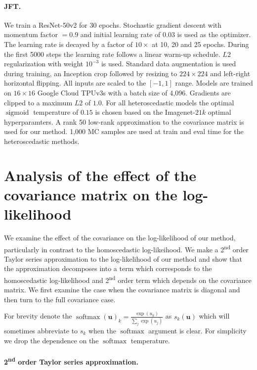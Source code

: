 \documentclass[final]{cvpr}
\DeclareMathOperator*{\softmax}{softmax}
\DeclareMathOperator*{\sigmoid}{sigmoid}
\begin{document}
\paragraph{JFT.} We train a ResNet-50v2 \cite{he2016deep} for 30 epochs. Stochastic gradient descent with momentum factor $= 0.9$ and initial learning rate of $0.03$ is used as the optimizer. The learning rate is decayed by a factor of $10\times$ at 10, 20 and 25 epochs. During the first 5000 steps the learning rate follows a linear warm-up schedule. $L2$ regularization with weight $10^{-3}$ is used. Standard data augmentation is used during training, an Inception crop followed by resizing to $224 \times 224$ and left-right horizontal flipping. All inputs are scaled to the $[-1, 1]$ range. Models are trained on $16 \times 16$ Google Cloud TPUv3s with a batch size of 4,096. Gradients are clipped to a maximum $L2$ of $1.0$. For all heteroscedastic models the optimal $\sigmoid$ temperature of $0.15$ is chosen based on the Imagenet-$21k$ optimal hyperparamters. A rank 50 low-rank approximation to the covariance matrix is used for our method. 1,000 MC samples are used at train and eval time for the heteroscedastic methods.

\section{Analysis of the effect of the covariance matrix on the log-likelihood}
\label{app:correlations_effect}

We examine the effect of the covariance on the log-likelihood of our method, particularly in contrast to the homoscedastic log-likeihood. We make a 2\textsuperscript{nd} order Taylor series approximation to the log-likelihood of our method and show that the approximation decomposes into a term which corresponds to the homoscedastic log-likelihood and 2\textsuperscript{nd} order term which depends on the covariance matrix. We first examine the case when the covariance matrix is diagonal and then turn to the full covariance case.

For brevity denote the $\softmax(\mathbf{u})_k = \frac{\exp(u_k)}{\sum_j \exp(u_j)}$ as $s_k(\mathbf{u})$ which will sometimes abbreviate to $s_k$ when the $\softmax$ argument is clear. For simplicity we drop the dependence on the $\softmax$ temperature.

\paragraph{2\textsuperscript{nd} order Taylor series approximation.}
\end{document}

